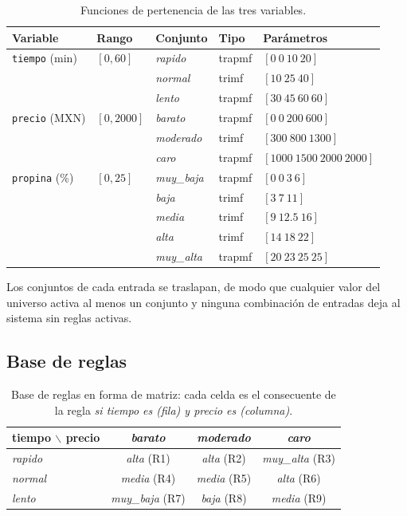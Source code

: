 \documentclass[11pt,letterpaper]{article}
\newcommand{\mf}[1]{\textit{#1}}
\begin{document}
\begin{table}[H]
\centering
\small
\caption{Funciones de pertenencia de las tres variables.}
\label{tab:mfs}
\begin{tabular}{lllll}
\toprule
Variable & Rango & Conjunto & Tipo & Parámetros \\
\midrule
\texttt{tiempo} (min) & $[0, 60]$ & \mf{rapido} & trapmf & $[0\ 0\ 10\ 20]$ \\
 & & \mf{normal} & trimf & $[10\ 25\ 40]$ \\
 & & \mf{lento} & trapmf & $[30\ 45\ 60\ 60]$ \\
\midrule
\texttt{precio} (MXN) & $[0, 2000]$ & \mf{barato} & trapmf & $[0\ 0\ 200\ 600]$ \\
 & & \mf{moderado} & trimf & $[300\ 800\ 1300]$ \\
 & & \mf{caro} & trapmf & $[1000\ 1500\ 2000\ 2000]$ \\
\midrule
\texttt{propina} (\%) & $[0, 25]$ & \mf{muy\_baja} & trapmf & $[0\ 0\ 3\ 6]$ \\
 & & \mf{baja} & trimf & $[3\ 7\ 11]$ \\
 & & \mf{media} & trimf & $[9\ 12.5\ 16]$ \\
 & & \mf{alta} & trimf & $[14\ 18\ 22]$ \\
 & & \mf{muy\_alta} & trapmf & $[20\ 23\ 25\ 25]$ \\
\bottomrule
\end{tabular}
\end{table}

Los conjuntos de cada entrada se traslapan, de modo que cualquier valor del universo activa al menos un conjunto y ninguna combinación de entradas deja al sistema sin reglas activas.

\subsection{Base de reglas}

\begin{table}[H]
\centering
\small
\caption{Base de reglas en forma de matriz: cada celda es el consecuente de la regla \emph{si tiempo es (fila) y precio es (columna)}.}
\label{tab:matriz}
\begin{tabular}{l|ccc}
\toprule
tiempo $\backslash$ precio & \mf{barato} & \mf{moderado} & \mf{caro} \\
\midrule
\mf{rapido} & \mf{alta} (R1) & \mf{alta} (R2) & \mf{muy\_alta} (R3) \\
\mf{normal} & \mf{media} (R4) & \mf{media} (R5) & \mf{alta} (R6) \\
\mf{lento} & \mf{muy\_baja} (R7) & \mf{baja} (R8) & \mf{media} (R9) \\
\bottomrule
\end{tabular}
\end{table}
\end{document}
